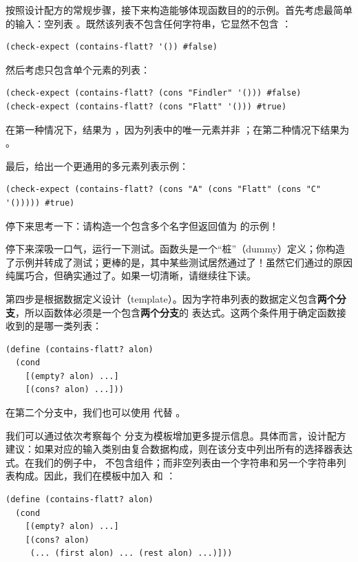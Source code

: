 按照设计配方的常规步骤，接下来构造能够体现函数目的的示例。首先考虑最简单的输入：空列表 。既然该列表不包含任何字符串，它显然不包含 ：
\begin{lstlisting}[language=BSL]
(check-expect (contains-flatt? '()) #false)
\end{lstlisting}

然后考虑只包含单个元素的列表：
\begin{lstlisting}[language=BSL]
(check-expect (contains-flatt? (cons "Findler" '())) #false)
(check-expect (contains-flatt? (cons "Flatt" '())) #true)
\end{lstlisting}
在第一种情况下，结果为 ，因为列表中的唯一元素并非 ；在第二种情况下结果为 。

最后，给出一个更通用的多元素列表示例：
\begin{lstlisting}[language=BSL]
(check-expect (contains-flatt? (cons "A" (cons "Flatt" (cons "C" '())))) #true)
\end{lstlisting}
停下来思考一下：请构造一个包含多个名字但返回值为  的示例！

停下来深吸一口气，运行一下测试。函数头是一个“桩”（dummy）定义；你构造了示例并转成了测试；更棒的是，其中某些测试居然通过了！虽然它们通过的原因纯属巧合，但确实通过了。如果一切清晰，请继续往下读。

第四步是根据数据定义设计（template）。因为字符串列表的数据定义包含\textbf{两个分支}，所以函数体必须是一个包含\textbf{两个分支}的  表达式。这两个条件用于确定函数接收到的是哪一类列表：
\begin{lstlisting}[language=BSL]
(define (contains-flatt? alon)
  (cond
    [(empty? alon) ...]
    [(cons? alon) ...]))
\end{lstlisting}
在第二个分支中，我们也可以使用  代替 。

我们可以通过依次考察每个  分支为模板增加更多提示信息。具体而言，设计配方建议：如果对应的输入类别由复合数据构成，则在该分支中列出所有的选择器表达式。在我们的例子中， 不包含组件；而非空列表由一个字符串和另一个字符串列表构成。因此，我们在模板中加入  和 ：
\begin{lstlisting}[language=BSL]
(define (contains-flatt? alon)
  (cond
    [(empty? alon) ...]
    [(cons? alon)
     (... (first alon) ... (rest alon) ...)]))
\end{lstlisting}

